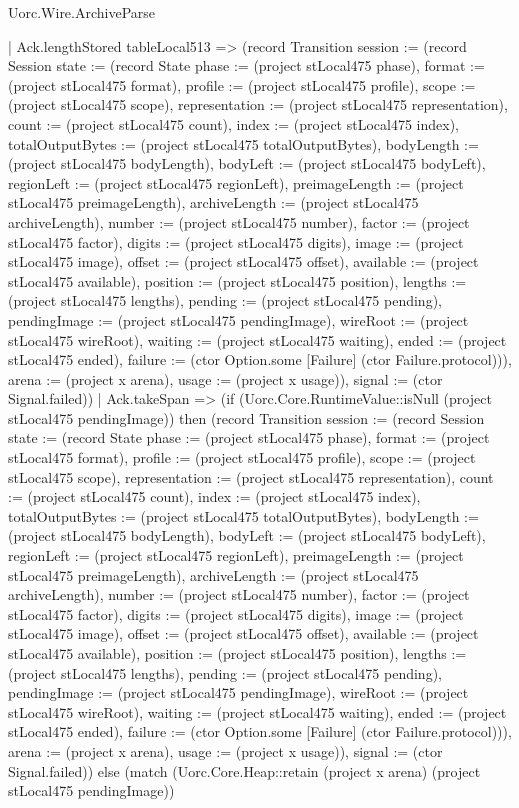 \begin{lexlean}{Uorc.Wire.ArchiveParse}
\begin{semanticmodule}
{          | Ack.lengthStored tableLocal513 => (record Transition {session := (record Session {state := (record State {phase := (project stLocal475 phase), format := (project stLocal475 format), profile := (project stLocal475 profile), scope := (project stLocal475 scope), representation := (project stLocal475 representation), count := (project stLocal475 count), index := (project stLocal475 index), totalOutputBytes := (project stLocal475 totalOutputBytes), bodyLength := (project stLocal475 bodyLength), bodyLeft := (project stLocal475 bodyLeft), regionLeft := (project stLocal475 regionLeft), preimageLength := (project stLocal475 preimageLength), archiveLength := (project stLocal475 archiveLength), number := (project stLocal475 number), factor := (project stLocal475 factor), digits := (project stLocal475 digits), image := (project stLocal475 image), offset := (project stLocal475 offset), available := (project stLocal475 available), position := (project stLocal475 position), lengths := (project stLocal475 lengths), pending := (project stLocal475 pending), pendingImage := (project stLocal475 pendingImage), wireRoot := (project stLocal475 wireRoot), waiting := (project stLocal475 waiting), ended := (project stLocal475 ended), failure := (ctor Option.some [Failure] (ctor Failure.protocol))}), arena := (project x arena), usage := (project x usage)}), signal := (ctor Signal.failed)})
          | Ack.takeSpan => (if (Uorc.Core.RuntimeValue::isNull (project stLocal475 pendingImage)) then (record Transition {session := (record Session {state := (record State {phase := (project stLocal475 phase), format := (project stLocal475 format), profile := (project stLocal475 profile), scope := (project stLocal475 scope), representation := (project stLocal475 representation), count := (project stLocal475 count), index := (project stLocal475 index), totalOutputBytes := (project stLocal475 totalOutputBytes), bodyLength := (project stLocal475 bodyLength), bodyLeft := (project stLocal475 bodyLeft), regionLeft := (project stLocal475 regionLeft), preimageLength := (project stLocal475 preimageLength), archiveLength := (project stLocal475 archiveLength), number := (project stLocal475 number), factor := (project stLocal475 factor), digits := (project stLocal475 digits), image := (project stLocal475 image), offset := (project stLocal475 offset), available := (project stLocal475 available), position := (project stLocal475 position), lengths := (project stLocal475 lengths), pending := (project stLocal475 pending), pendingImage := (project stLocal475 pendingImage), wireRoot := (project stLocal475 wireRoot), waiting := (project stLocal475 waiting), ended := (project stLocal475 ended), failure := (ctor Option.some [Failure] (ctor Failure.protocol))}), arena := (project x arena), usage := (project x usage)}), signal := (ctor Signal.failed)}) else (match (Uorc.Core.Heap::retain (project x arena) (project stLocal475 pendingImage))
}
\end{semanticmodule}
\end{lexlean}
